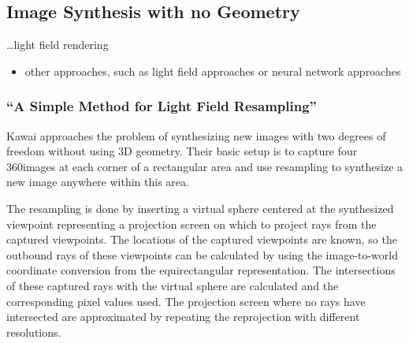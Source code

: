 
\subsection{Image Synthesis with no Geometry}
\ldots light field rendering \cite{lightfield}

\begin{itemize}
  \item other approaches, such as light field approaches or neural network approaches
\end{itemize}

\subsubsection{``A Simple Method for Light Field Resampling'' \cite{simple_poster}}
Kawai \cite{simple_poster} approaches the problem of synthesizing new images with two degrees of freedom without using 3D geometry. Their basic setup is to capture four 360\degree images at each corner of a rectangular area and use resampling to synthesize a new image anywhere within this area.

The resampling is done by inserting a virtual sphere centered at the synthesized viewpoint representing a projection screen on which to project rays from the captured viewpoints. The locations of the captured viewpoints are known, so the outbound rays of these viewpoints can be calculated by using the image-to-world coordinate conversion from the equirectangular representation. The intersections of these captured rays with the virtual sphere are calculated and the corresponding pixel values used. The projection screen where no rays have intersected are approximated by repeating the reprojection with different resolutions.

